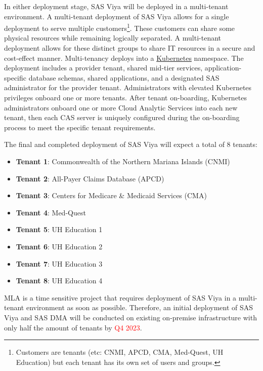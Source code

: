 In either deployment stage, SAS Viya will be deployed in a multi-tenant environment. A multi-tenant deployment of SAS Viya allows for a single deployment to serve multiple customers\footnote{Customers are tenants (etc: CNMI, APCD, CMA, Med-Quest, UH Education) but each tenant has its own set of users and groups.}. These customers can share some physical resources while remaining logically separated. A multi-tenant deployment allows for these distinct groups to share IT resources in a secure and cost-effect manner. Multi-tenancy deploys into a \href{https://kubernetes.io/}{Kubernetes} namespace. The deployment includes a provider tenant, shared mid-tier services, application-specific database schemas, shared applications, and a designated SAS administrator for the provider tenant. Administrators with elevated Kubernetes privileges onboard one or more tenants. After tenant on-boarding, Kubernetes administrators onboard one or more Cloud Analytic Services into each new tenant, then each CAS server is uniquely configured during the on-boarding process to meet the specific tenant requirements. 

The final and completed deployment of SAS Viya will expect a total of 8 tenants:

\begin{itemize}
    \item \textbf{Tenant 1}: Commonwealth of the Northern Mariana Islands (CNMI)
    \item \textbf{Tenant 2}: All-Payer Claims Database (APCD)
    \item \textbf{Tenant 3}: Centers for Medicare \& Medicaid Services (CMA)
    \item \textbf{Tenant 4}: Med-Quest
    \item \textbf{Tenant 5}: UH Education 1
    \item \textbf{Tenant 6}: UH Education 2
    \item \textbf{Tenant 7}: UH Education 3
    \item \textbf{Tenant 8}: UH Education 4
\end{itemize}


MLA is a time sensitive project that requires deployment of SAS Viya in a multi-tenant environment as soon as possible. Therefore, an initial deployment of SAS Viya and SAS DMA will be conducted on existing on-premise infrastructure with only half the amount of tenants by \textcolor{red}{Q4 2023}. 

